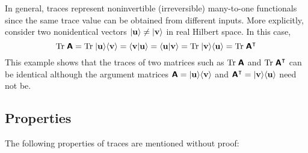 In general, traces represent noninvertible (irreversible) many-to-one functionals
since the same trace value can be obtained from different inputs.
More explicitly, consider two nonidentical vectors  $\vert {\bf u} \rangle \neq \vert {\bf v} \rangle$ in real Hilbert space.
In this case,
\begin{equation}
\textrm{Tr}\;\textsf{\textbf{A}} =
\textrm{Tr}\;\vert {\bf u} \rangle \langle {\bf v} \rangle =
\langle {\bf v} \vert  {\bf u} \rangle
=
\langle {\bf u} \vert  {\bf v} \rangle =
\textrm{Tr}\;\vert {\bf v} \rangle \langle {\bf u} \rangle =
\textrm{Tr}\;\textsf{\textbf{A}}^\intercal
\end{equation}
This example shows that the traces of two matrices such as $\textrm{Tr}\;\textsf{\textbf{A}}$ and $\textrm{Tr}\;\textsf{\textbf{A}}^\intercal $ can be identical although
the argument matrices  $\textsf{\textbf{A}}=\vert {\bf u} \rangle \langle {\bf v} \rangle
$ and $\textsf{\textbf{A}}^\intercal  = \vert {\bf v} \rangle \langle {\bf u} \rangle$ need not be.

\subsection{Properties}

The following properties of traces are mentioned without proof:

